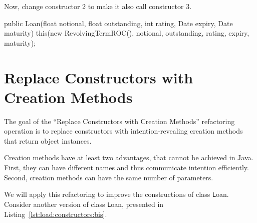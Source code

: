 \documentclass[a4paper,11pt]{memoir}
\newcommand{\code}[1]{{\texttt #1}}
\begin{document}
\begin{exercise}
Now, change constructor 2 to make it also call constructor 3.
\end{exercise}

\begin{solution}
\begin{java}
public Loan(float notional, float outstanding, int rating, Date expiry, Date maturity) {
    this(new RevolvingTermROC(), notional, outstanding, rating, expiry, maturity);
}	
\end{java}
\end{solution}


\section{Replace Constructors with Creation Methods}
The goal of the ``Replace Constructors with Creation Methods'' refactoring operation is to 
replace constructors with intention-revealing creation methods that return object instances.

Creation methods have at least two advantages, that cannot be achieved in Java. 
First, they can have different names and thus communicate intention efficiently.
Second, creation methods can have the same number of parameters.

We will apply this refactoring to improve the constructions of class \code{Loan}.
Consider another version of class \code{Loan}, presented in Listing~\ref{lst:load:constructors:bis}.
\end{document}
